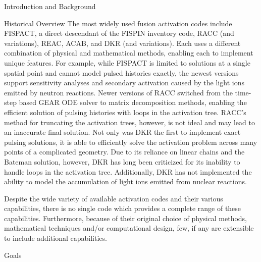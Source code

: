 \begin{chapter}{Introduction and Background}
\begin{section}{Historical Overview}
    The most widely used fusion activation codes include
    FISPACT\cite{FISPACT}, a direct descendant of the FISPIN inventory
    code, RACC\cite{RACC} (and variations\cite{RACCP,RACCUW}),
    REAC\cite{REAC}, ACAB\cite{ACAB}, and DKR\cite{DKR} (and
    variations\cite{adjoint,DKRICF,DKRP}).  Each uses a different
    combination of physical and mathematical methods, enabling each to
    implement unique features.  For example, while FISPACT is limited
    to solutions at a single spatial point and cannot model pulsed
    histories exactly, the newest versions support sensitivity
    analyses and secondary activation caused by the light ions emitted
    by neutron reactions.  Newer versions of RACC switched from the
    time-step based GEAR ODE solver to matrix decomposition methods,
    enabling the efficient solution of pulsing histories with loops in
    the activation tree.  RACC's method for truncating the activation
    trees, however, is not ideal and may lead to an inaccurate final
    solution.  Not only was DKR the first to implement exact pulsing
    solutions, it is able to efficiently solve the activation problem
    across many points of a complicated geometry.  Due to its reliance
    on linear chains and the Bateman solution, however, DKR has long
    been criticized for its inability to handle loops in the
    activation tree.  Additionally, DKR has not implemented the
    ability to model the accumulation of light ions emitted from
    nuclear reactions.
  
    Despite the wide variety of available activation codes and their
    various capabilities, there is no single code which provides a
    complete range of these capabilities.  Furthermore, because of
    their original choice of physical methods, mathematical techniques
    and/or computational design, few, if any are extensible to include
    additional capabilities.
  
  \end{section}
  
  \begin{section}{Goals}
    

\end{section}
\end{chapter}
